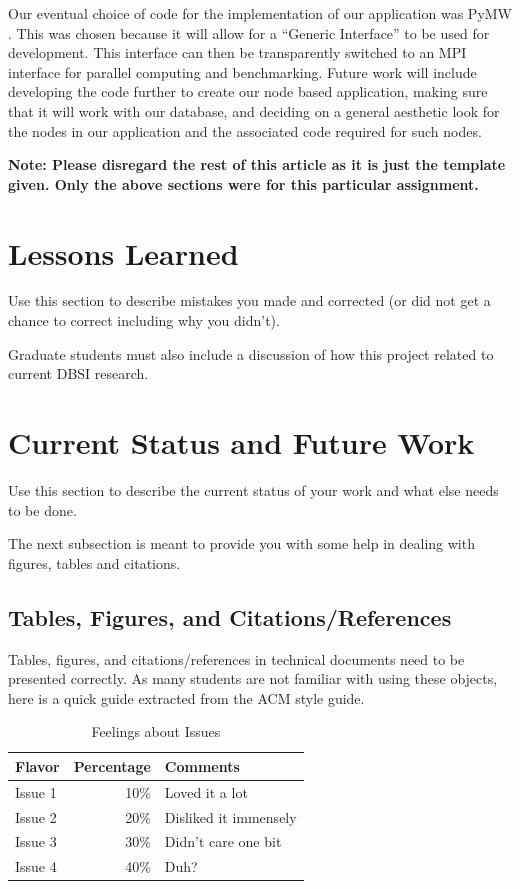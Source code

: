 \documentclass{sig-alternate}
\begin{document}
Our eventual choice of code for the implementation of our application was PyMW \cite {ieee5161132}. 
This was chosen because it will allow for a ``Generic Interface'' to be used for development. 
This interface can then be transparently switched to an MPI interface for parallel computing and 
benchmarking. Future work will include developing the code further to create our node based 
application, making sure that it will work with our database, and deciding on a general 
aesthetic look for the nodes in our application and the associated code required for such nodes. 

{\bf Note: Please disregard the rest of this article as it is just
the template given. Only the above sections were 
for this particular assignment.}


\section{Lessons Learned}
\label{mistakes}

Use this section to describe mistakes you made and corrected (or did
not get a chance to correct including why you didn't).

Graduate students must also include a discussion of how this project
related to current DBSI research.

\section{Current Status and Future Work}
\label{current status}

Use this section to describe the current status of your work
and what else needs to be done.

The next subsection is meant to provide you with some help
in dealing with figures, tables and citations.

\subsection{Tables, Figures, and Citations/References}

Tables, figures, and citations/references in technical
documents need to be presented correctly. As many students
are not familiar with using these objects, here is a quick
guide extracted from the ACM style guide.

\begin{table}
\centering
\caption{Feelings about Issues}
\begin{tabular}{|l|r|l|} \hline
Flavor&Percentage&Comments\\ \hline
Issue 1 &  10\% & Loved it a lot\\ \hline
Issue 2 &  20\% & Disliked it immensely\\ \hline
Issue 3 &  30\% & Didn't care one bit\\ \hline
Issue 4 &  40\% & Duh?\\ \hline
\end{tabular}
\end{table}
\end{document}
